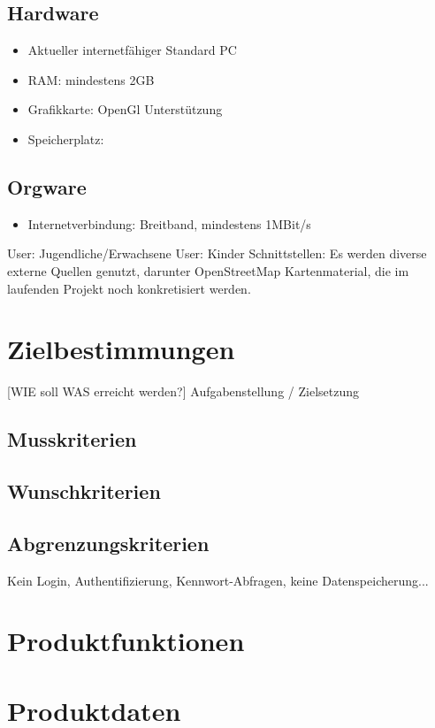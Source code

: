 \documentclass[10pt]{report}
\begin{document}
\section{Hardware}
\begin{itemize}
\item Aktueller internetfähiger Standard PC
\item RAM: mindestens 2GB
\item Grafikkarte: OpenGl Unterstützung
\item Speicherplatz: 
\end{itemize}


\section{Orgware}
\begin{itemize}
\item Internetverbindung: Breitband, mindestens 1MBit/s
\end{itemize}

User: Jugendliche/Erwachsene
User: Kinder
Schnittstellen: Es  werden  diverse  externe  Quellen genutzt, darunter OpenStreetMap Kartenmaterial, die im laufenden Projekt noch konkretisiert werden.


\chapter{Zielbestimmungen}
[WIE soll WAS erreicht werden?]
Aufgabenstellung / Zielsetzung

\section{Musskriterien}
\section{Wunschkriterien}
\section{Abgrenzungskriterien}
Kein Login, Authentifizierung, Kennwort-Abfragen, keine Datenspeicherung...



\chapter{Produktfunktionen}

\chapter{Produktdaten}
\end{document}
